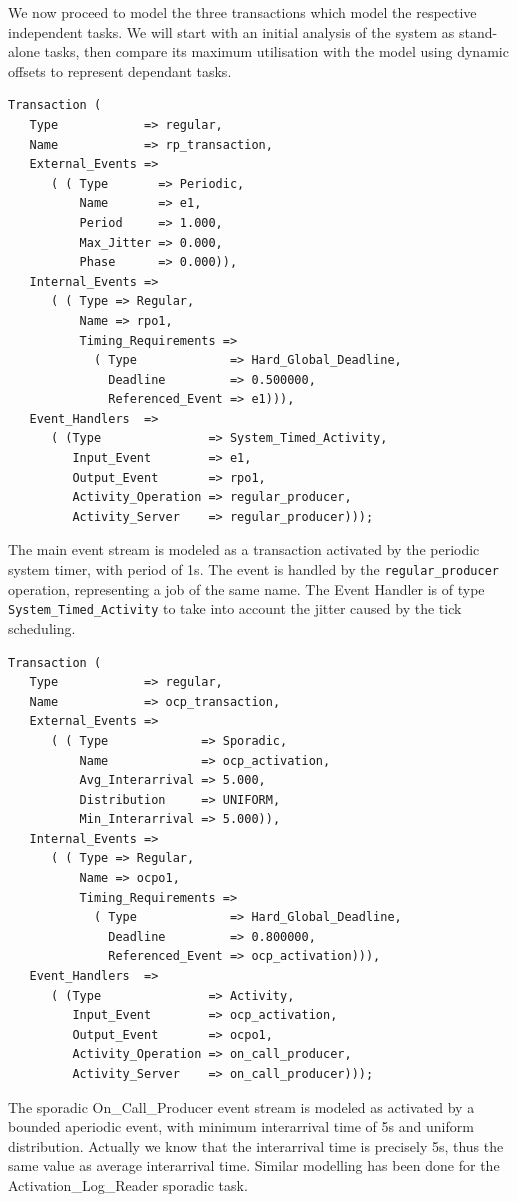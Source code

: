 \documentclass{article}
\begin{document}
We now proceed to model the three transactions which model the respective independent tasks. We will start with an initial analysis of the system as stand-alone tasks, then compare its maximum utilisation with the model using dynamic offsets to represent dependant tasks.

\begin{lstlisting}
Transaction (
   Type            => regular,
   Name            => rp_transaction,
   External_Events =>
      ( ( Type       => Periodic,
          Name       => e1,
          Period     => 1.000,
          Max_Jitter => 0.000,
          Phase      => 0.000)),
   Internal_Events =>
      ( ( Type => Regular,
          Name => rpo1,
          Timing_Requirements =>
            ( Type             => Hard_Global_Deadline,
              Deadline         => 0.500000,
              Referenced_Event => e1))),
   Event_Handlers  =>
      ( (Type               => System_Timed_Activity,
         Input_Event        => e1,
         Output_Event       => rpo1,
         Activity_Operation => regular_producer,
         Activity_Server    => regular_producer)));
\end{lstlisting}

The main event stream is modeled as a transaction activated by the periodic system timer, with period of 1s. The event is handled by the \texttt{regular\_producer} operation, representing a job of the same name. The Event Handler is of type \texttt{System\_Timed\_Activity} to take into account the jitter caused by the tick scheduling.

\begin{lstlisting}
Transaction (
   Type            => regular,
   Name            => ocp_transaction,
   External_Events =>
      ( ( Type             => Sporadic,
          Name             => ocp_activation,
          Avg_Interarrival => 5.000,
          Distribution     => UNIFORM,
          Min_Interarrival => 5.000)),
   Internal_Events =>
      ( ( Type => Regular,
          Name => ocpo1,
          Timing_Requirements =>
            ( Type             => Hard_Global_Deadline,
              Deadline         => 0.800000,
              Referenced_Event => ocp_activation))),
   Event_Handlers  =>
      ( (Type               => Activity,
         Input_Event        => ocp_activation,
         Output_Event       => ocpo1,
         Activity_Operation => on_call_producer,
         Activity_Server    => on_call_producer)));
\end{lstlisting}

The sporadic On\_Call\_Producer event stream is modeled as activated by a bounded aperiodic event, with minimum interarrival time of 5s and uniform distribution. Actually we know that the interarrival time is precisely 5s, thus the same value as average interarrival time. Similar modelling has been done for the Activation\_Log\_Reader sporadic task.
\end{document}
